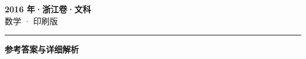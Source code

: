 \documentclass[zihao=5, a4paper]{ctexart}
\begin{document}
\begin{center}
  {\Large\bfseries 2016 年·浙江卷·文科}\\[4pt]
  {\large 数学 · 印刷版}
\end{center}
\medskip
{}

\par\bigskip\hrule\bigskip
{}
\begin{center}{\large\bfseries 参考答案与详细解析}\end{center}
\smallskip

\end{document}
